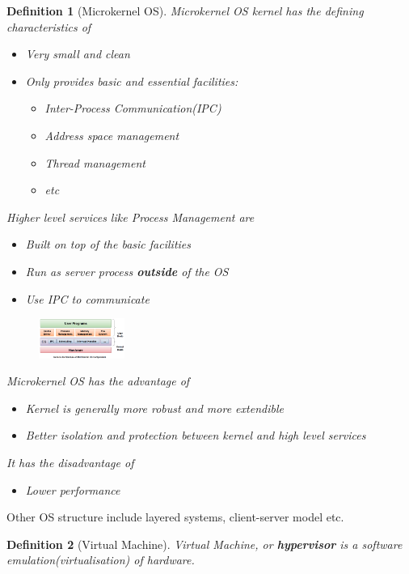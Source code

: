 \documentclass[11pt]{article}
\newtheorem{definition}{Definition}[section]
\theoremstyle{definition}
\begin{document}
\begin{definition}[Microkernel OS]
\normalfont Microkernel OS kernel has the defining characteristics of 
\begin{itemize}[itemsep=0pt]
  \item Very small and clean
  \item Only provides basic and essential facilities:
  \begin{itemize}[itemsep=0pt]
    \item Inter-Process Communication(IPC)
    \item Address space management
    \item Thread management
    \item etc
  \end{itemize}
\end{itemize}
Higher level services like Process Management are
\begin{itemize}[itemsep=0pt]
  \item Built \textit{on top of} the basic facilities
  \item Run as server process \textbf{outside} of the OS
  \item Use IPC to communicate
\end{itemize}
\begin{figure}[h]
\centering
\includegraphics[width = 0.25\textwidth]{1_7.png}
\end{figure}
Microkernel OS has the advantage of
\begin{itemize}[itemsep=0pt]
  \item Kernel is generally more robust and more extendible
  \item Better isolation and protection between kernel and high level services
\end{itemize}
It has the disadvantage of
\begin{itemize}[itemsep=0pt]
  \item Lower performance
\end{itemize}
\end{definition}
Other OS structure include layered systems, client-server model etc.
\begin{definition}[Virtual Machine]
\normalfont Virtual Machine, or \textbf{hypervisor} is a software emulation(virtualisation) of hardware.
\end{definition}
\end{document}
